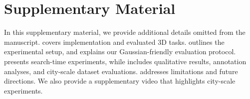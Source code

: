 \section*{Supplementary Material}

In this supplementary material, we provide additional details omitted from the manuscript.  covers implementation and evaluated 3D tasks.  outlines the experimental setup, and  explains our Gaussian-friendly evaluation protocol.  presents search-time experiments, while  includes qualitative results, annotation analyses, and city-scale dataset evaluations.  addresses limitations and future directions. We also provide a supplementary video that highlights city-scale experiments.